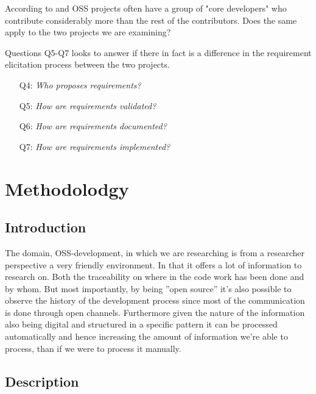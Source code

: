 \documentclass[a4paper,11pt]{article}
\begin{document}
{\begin{itemize}
	According to \cite{Noll} and \cite{Mockus2002a} OSS projects often have a group of "core developers" who contribute considerably more than the rest of the contributors. Does the same apply to the two projects we are examining?
\end{itemize}
Questions Q5-Q7 looks to answer if there in fact is a difference in the requirement elicitation process between the two projects.
\begin{itemize}
	\item[Q4:]\emph{Who proposes requirements?}
	\item[Q5:]\emph{How are requirements validated?}
	\item[Q6:]\emph{How are requirements documented?}
	\item[Q7:]\emph{How are requirements implemented?}
\end{itemize}

\section{Methodolodgy}
\subsection{Introduction}
The domain, OSS-development, in which we are researching is from a researcher perspective a very friendly environment. In that it offers a lot of information to research on. Both the traceability on where in the code work has been done and by whom. But most importantly, by being ''open source'' it's also possible to observe the history of the development process since most of the communication is done through open channels. Furthermore given the nature of the information also being digital and structured in a specific pattern it can be processed automatically and hence increasing the amount of information we're able to process, than if we were to process it manually.

\subsection{Description}



	
}
\end{document}
